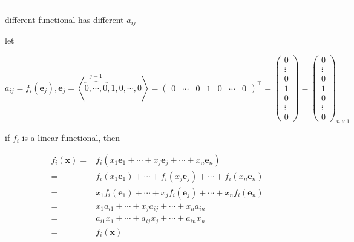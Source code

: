 \documentclass[
]{book}
\theoremstyle{definition}
\theoremstyle{definition}
\theoremstyle{definition}
\theoremstyle{definition}
\theoremstyle{remark}
\begin{document}
\begin{center}\rule{0.5\linewidth}{0.5pt}\end{center}

different functional has different \(a_{\scriptscriptstyle{ij}}\)

let

\[
a_{{\scriptscriptstyle ij}}=f_{{\scriptscriptstyle i}}\left(\boldsymbol{e}_{{\scriptscriptstyle j}}\right),\boldsymbol{e}_{{\scriptscriptstyle j}}=\left\langle \overset{j-1}{\overbrace{0,\cdots,0}},1,0,\cdots,0\right\rangle =\begin{pmatrix}0 & \cdots & 0 & 1 & 0 & \cdots & 0\end{pmatrix}^{\intercal}=\begin{pmatrix}0\\
\vdots\\
0\\
1\\
0\\
\vdots\\
0
\end{pmatrix}=\begin{pmatrix}0\\
\vdots\\
0\\
1\\
0\\
\vdots\\
0
\end{pmatrix}_{n\times1}
\]

if \(f_{{\scriptscriptstyle i}}\) is a linear functional, then

\[
\begin{aligned}
f_{{\scriptscriptstyle i}}\left(\boldsymbol{x}\right)= & f_{{\scriptscriptstyle i}}\left(x_{{\scriptscriptstyle 1}}\boldsymbol{e}_{{\scriptscriptstyle 1}}+\cdots+x_{{\scriptscriptstyle j}}\boldsymbol{e}_{{\scriptscriptstyle j}}+\cdots+x_{{\scriptscriptstyle n}}\boldsymbol{e}_{{\scriptscriptstyle n}}\right)\\
= & f_{{\scriptscriptstyle i}}\left(x_{{\scriptscriptstyle 1}}\boldsymbol{e}_{{\scriptscriptstyle 1}}\right)+\cdots+f_{{\scriptscriptstyle i}}\left(x_{{\scriptscriptstyle j}}\boldsymbol{e}_{{\scriptscriptstyle j}}\right)+\cdots+f_{{\scriptscriptstyle i}}\left(x_{{\scriptscriptstyle n}}\boldsymbol{e}_{{\scriptscriptstyle n}}\right)\\
= & x_{{\scriptscriptstyle 1}}f_{{\scriptscriptstyle i}}\left(\boldsymbol{e}_{{\scriptscriptstyle 1}}\right)+\cdots+x_{{\scriptscriptstyle j}}f_{{\scriptscriptstyle i}}\left(\boldsymbol{e}_{{\scriptscriptstyle j}}\right)+\cdots+x_{{\scriptscriptstyle n}}f_{{\scriptscriptstyle i}}\left(\boldsymbol{e}_{{\scriptscriptstyle n}}\right)\\
= & x_{{\scriptscriptstyle 1}}a_{{\scriptscriptstyle i1}}+\cdots+x_{{\scriptscriptstyle j}}a_{{\scriptscriptstyle ij}}+\cdots+x_{{\scriptscriptstyle n}}a_{{\scriptscriptstyle in}}\\
= & a_{{\scriptscriptstyle i1}}x_{{\scriptscriptstyle 1}}+\cdots+a_{{\scriptscriptstyle ij}}x_{{\scriptscriptstyle j}}+\cdots+a_{{\scriptscriptstyle in}}x_{{\scriptscriptstyle n}}\\
= & f_{{\scriptscriptstyle i}}\left(\boldsymbol{x}\right)
\end{aligned}
\]
\end{document}
